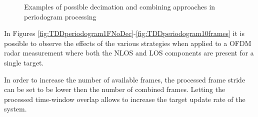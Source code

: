 \begin{figure}[H]
        \hfill
        
        \caption{Examples of possible decimation and combining approaches in periodogram processing}
        \label{fig:allperiodogram-decimation}
    \end{figure}

    In Figures \ref{fig:TDDperiodogram1FNoDec}-\ref{fig:TDDperiodogram10frames} it is possible to observe the effects of the various strategies when applied to a OFDM radar measurement where both the NLOS and LOS components are present for a single target.

	In order to increase the number of available frames, the processed frame stride can be set to be lower then the number of combined frames. Letting the processed time-window overlap allows to increase the target update rate of the system.

